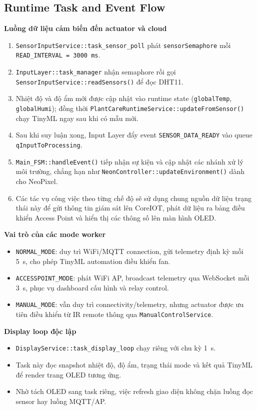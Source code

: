 \subsection{Runtime Task and Event Flow}
\textbf{Luồng dữ liệu cảm biến đến actuator và cloud}
\begin{enumerate}
    \item \texttt{SensorInputService::task\_sensor\_poll} phát \texttt{sensorSemaphore} mỗi \texttt{READ\_INTERVAL = 3000 ms}.
    \item \texttt{InputLayer::task\_manager} nhận semaphore rồi gọi \texttt{SensorInputService::readSensors()} để đọc DHT11.
    \item Nhiệt độ và độ ẩm mới được cập nhật vào runtime state (\texttt{globalTemp}, \texttt{globalHumi}); đồng thời \texttt{PlantCareRuntimeService::updateFromSensor()} chạy TinyML ngay sau khi có mẫu mới.
    \item Sau khi suy luận xong, Input Layer đẩy event \texttt{SENSOR\_DATA\_READY} vào queue \texttt{qInputToProcessing}.
    \item \texttt{Main\_FSM::handleEvent()} tiếp nhận sự kiện và cập nhật các nhánh xử lý môi trường, chẳng hạn như \texttt{NeonController::updateEnvironment()} dành cho NeoPixel.
    \item Các tác vụ công việc theo từng chế độ sẽ sử dụng chung nguồn dữ liệu trạng thái này để gửi thông tin giám sát lên CoreIOT, phát dữ liệu ra bảng điều khiển Access Point và hiển thị các thông số lên màn hình OLED.
\end{enumerate}

\textbf{Vai trò của các mode worker}
\begin{itemize}
    \item \texttt{NORMAL\_MODE}: duy trì WiFi/MQTT connection, gửi telemetry định kỳ mỗi \SI{5}{s}, cho phép TinyML automation điều khiển fan.
    \item \texttt{ACCESSPOINT\_MODE}: phát WiFi AP, broadcast telemetry qua WebSocket mỗi \SI{3}{s}, phục vụ dashboard cấu hình và relay control.
    \item \texttt{MANUAL\_MODE}: vẫn duy trì connectivity/telemetry, nhưng actuator được ưu tiên điều khiển từ IR remote thông qua \texttt{ManualControlService}.
\end{itemize}

\textbf{Display loop độc lập}
\begin{itemize}
    \item \texttt{DisplayService::task\_display\_loop} chạy riêng với chu kỳ \SI{1}{s}.
    \item Task này đọc snapshot nhiệt độ, độ ẩm, trạng thái mode và kết quả TinyML để render trang OLED tương ứng.
    \item Nhờ tách OLED sang task riêng, việc refresh giao diện không chặn luồng đọc sensor hay luồng MQTT/AP.
\end{itemize}

